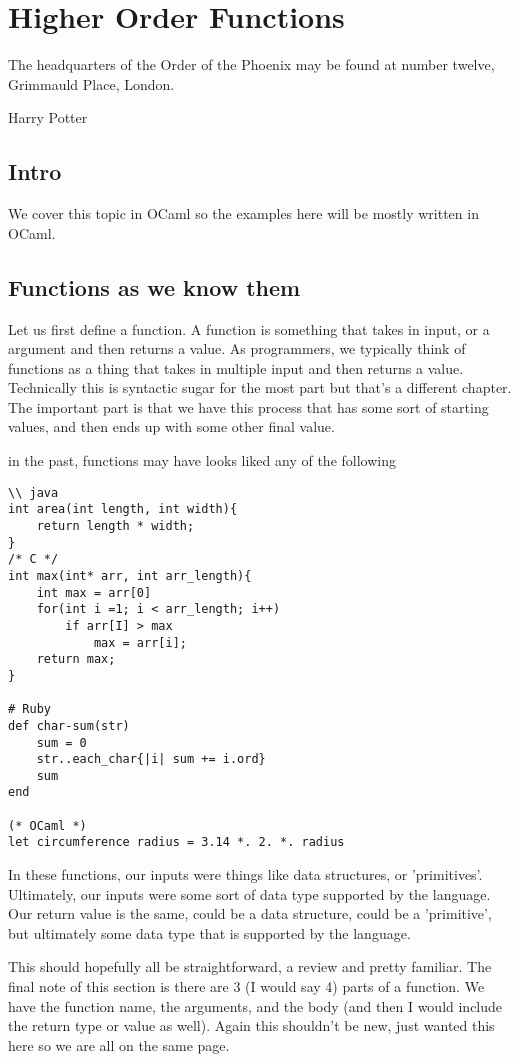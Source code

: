 \documentclass[main.tex]{subfiles}
\begin{document}
\chapter{Higher Order Functions}
\epigraph{The headquarters of the Order of the Phoenix may be found at number twelve, Grimmauld Place, London.}{Harry Potter}
\section{Intro}
We cover this topic in OCaml so the examples here will be mostly written in OCaml.

\section{Functions as we know them}

Let us first define a function. A function is something that takes in input, or a argument and then returns a value. 
As programmers, we typically think of functions as a thing that takes in multiple input and then returns a value. 
Technically this is syntactic sugar for the most part but that's a different chapter. 
The important part is that we have this process that has some sort of starting values, and then ends up with some other final value. 

in the past, functions may have looks liked any of the following
\begin{lstlisting}
\\ java
int area(int length, int width){
    return length * width;
}
/* C */
int max(int* arr, int arr_length){
    int max = arr[0]
    for(int i =1; i < arr_length; i++)
        if arr[I] > max
            max = arr[i];
    return max;
}

# Ruby
def char-sum(str)
    sum = 0
    str..each_char{|i| sum += i.ord}
    sum
end

(* OCaml *)
let circumference radius = 3.14 *. 2. *. radius
\end{lstlisting}

In these functions, our inputs were things like data structures, or 'primitives'. Ultimately, our inputs were some sort of data type supported by the language. Our return value is the same, could be a data structure, could be a 'primitive', but ultimately some data type that is supported by the language. 

This should hopefully all be straightforward, a review and pretty familiar. The final note of this section is there are 3 (I would say 4) parts of a function. We have the function name, the arguments, and the body (and then I would include the return type or value as well). 
Again this shouldn't be new, just wanted this here so we are all on the same page.
\end{document}
